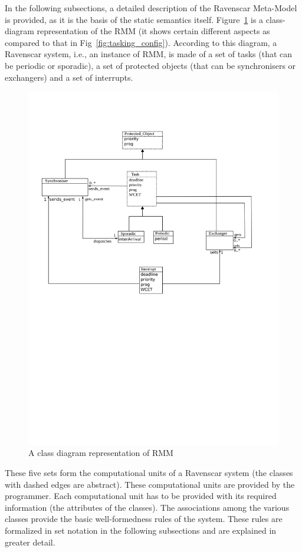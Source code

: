 In the following subsections, a detailed description of the Ravenscar
Meta-Model is provided, as it is the basis of the static semantics
itself. Figure~\ref{fig:rmm} is a class-diagram representation of the
RMM (it shows certain different aspects as compared to that in
Fig~\ref{fig:tasking_config}). According to this diagram, a Ravenscar
system, i.e., an instance of RMM, is made of a set of tasks (that can
be periodic or sporadic), a set of protected objects (that can be
synchronisers or exchangers) and a set of interrupts.

\begin{figure}
\centering
\includegraphics[scale=0.75]{figs/rmm}
\caption{A class diagram representation of RMM}
\label{fig:rmm}
\end{figure}

These five sets form the computational units of a Ravenscar system
(the classes with dashed edges are abstract). These computational
units are provided by the programmer. Each computational unit has to
be provided with its required information (the attributes of the
classes). The associations among the various classes provide the basic
well-formedness rules of the system. These rules are formalized in set
notation in the following subsections and are explained in greater
detail.

